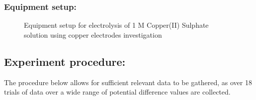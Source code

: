 \documentclass[11pt, a4]{article}
\begin{document}
			\subsubsection{Equipment setup:}
				\begin{figure}[H]
					\vspace{-4mm}
					\begin{center}
					\end{center}
					\caption{Equipment setup for electrolysis of 1 M Copper(II) Sulphate solution using copper electrodes investigation}
				\end{figure}
		\subsection{Experiment procedure:}
			The procedure below allows for sufficient relevant data to be gathered, as over 18 trials of data over a wide range of potential difference values are collected.
			
\end{document}
